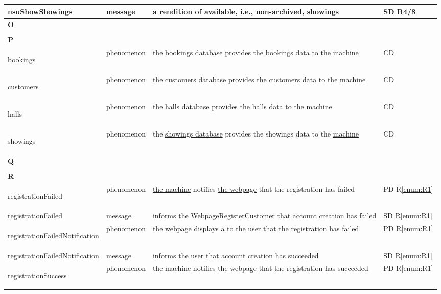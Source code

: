\documentclass[a4paper,10pt,titlepage,bibtotoc,bibtotocnumbered]{scrreprt}
\begin{document}
\begin{longtable}{|l|p{3cm}|p{5cm}|l|}
\hline
nsuShowShowings & message & a rendition of available, i.e., non-archived, showings & SD R4/8\\
\hline
\multicolumn{4}{|l|}{\textbf{O}}\\
\hline
&  &  & \\
\hline
\multicolumn{4}{|l|}{\textbf{P}}\\
\hline
\hypertarget{glossary:bookings}{bookings} & phenomenon & the \hyperlink{glossary:BookingsDatabase}{bookings database} provides the bookings data to the \hyperlink{glossary:UDEKino}{machine} & CD\\
\hline
\hypertarget{glossary:customers}{customers} & phenomenon & the \hyperlink{glossary:CustomersDatabase}{customers database} provides the customers data to the \hyperlink{glossary:UDEKino}{machine} & CD\\
\hline
\hypertarget{glossary:halls}{halls} & phenomenon & the \hyperlink{glossary:HallsDatabase}{halls database} provides the halls data to the \hyperlink{glossary:UDEKino}{machine} & CD\\
\hline
\hypertarget{glossary:showings}{showings} & phenomenon & the \hyperlink{glossary:ShowingsDatabase}{showings database} provides the showings data to the \hyperlink{glossary:UDEKino}{machine} & CD\\
\hline
\multicolumn{4}{|l|}{\textbf{Q}}\\
\hline
&  &  & \\
\hline
\multicolumn{4}{|l|}{\textbf{R}}\\
\hline
\hypertarget{glossary:registrationFailed}{registrationFailed} & phenomenon & \hyperlink{glossary:UDEKino}{the machine} notifies \hyperlink{glossary:WebpageRegisterCustomer}{the webpage} that the registration has failed & PD R\ref{enum:R1}\\
\hline
registrationFailed & message & informs the WebpageRegisterCustomer that account creation has failed & SD R\ref{enum:R1}\\
\hline
\hypertarget{glossary:registrationFailedNotification}{registrationFailedNotification} & phenomenon & \hyperlink{glossary:WebpageRegisterCustomer}{the webpage} displays a to \hyperlink{glossary:User}{the user} that the registration has failed & PD R\ref{enum:R1}\\
\hline
registrationFailedNotification & message & informs the user that account creation has succeeded & SD R\ref{enum:R1}\\
\hline
\hypertarget{glossary:registrationSuccess}{registrationSuccess} & phenomenon & \hyperlink{glossary:UDEKino}{the machine} notifies \hyperlink{glossary:WebpageRegisterCustomer}{the webpage} that the registration has succeeded & PD R\ref{enum:R1}\\

\end{longtable}
\end{document}
